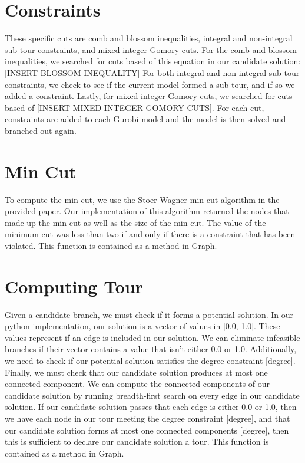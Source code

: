 \documentclass{article}
\begin{document}
\section{Constraints}
These specific cuts
are comb and blossom inequalities,
integral and non-integral sub-tour constraints,
and mixed-integer Gomory cuts.
For the comb and blossom inequalities,
we searched for cuts based of this equation
in our candidate solution:
[INSERT BLOSSOM INEQUALITY]
For both integral and non-integral sub-tour constraints,
we check to see
if the current model formed a sub-tour,
and if so we added a constraint.
Lastly, for mixed integer Gomory cuts,
we searched for cuts based of
[INSERT MIXED INTEGER GOMORY CUTS].
For each cut,
constraints are added
to each Gurobi model
and the model is then solved
and branched out again.

\section{Min Cut}
To compute the min cut,
we use the Stoer-Wagner min-cut algorithm
in the provided paper.
Our implementation of this algorithm
returned the nodes that made up the min cut
as well as the size of the min cut.
The value of the minimum cut
was less than two
if and only if
there is a constraint that has been violated.
This function is contained as a method in Graph.

\section{Computing Tour}
Given a candidate branch,
we must check if it forms a potential solution.
In our python implementation,
our solution is a vector of values in [0.0, 1.0].
These values represent
if an edge is included in our solution.
We can eliminate infeasible branches
if their vector contains a value
that isn’t either 0.0 or 1.0.
Additionally, we need to check
if our potential solution satisfies
the degree constraint [degree].
Finally, we must check
that our candidate solution produces
at most one connected component.
We can compute the connected components
of our candidate solution
by running breadth-first search
on every edge in our candidate solution.
If our candidate solution passes
that each edge is either 0.0 or 1.0,
then we have each node in our tour
meeting the degree constraint [degree],
and that our candidate solution
forms at most one connected components [degree],
then this is sufficient to declare
our candidate solution a tour.
This function is contained as a method in Graph.
\end{document}
